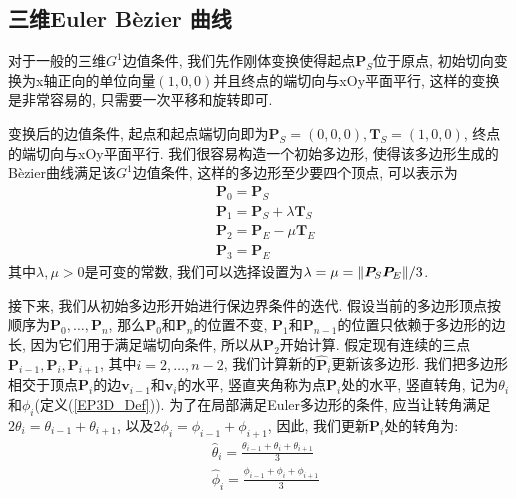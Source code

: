 \documentclass[utf8]{ctexart} %
\begin{document}
	 \subsection{三维Euler B\`{e}zier 曲线}
	 对于一般的三维$G^1$边值条件, 我们先作刚体变换使得起点$\boldsymbol{P}_S$位于原点, 初始切向变换为x轴正向的单位向量$(1,0,0)$并且终点的端切向与xOy平面平行, 这样的变换是非常容易的, 只需要一次平移和旋转即可. \par
	 变换后的边值条件, 起点和起点端切向即为$\boldsymbol{P}_S=(0,0,0), \boldsymbol{T}_S = (1,0,0)$, 终点的端切向与xOy平面平行. 我们很容易构造一个初始多边形, 使得该多边形生成的B\`ezier曲线满足该$G^1$边值条件, 这样的多边形至少要四个顶点, 可以表示为
	 \begin{equation}
	 	\begin{aligned}
	 		&\boldsymbol{P}_0 = \boldsymbol{P}_S\\
	 		&\boldsymbol{P}_1 = \boldsymbol{P}_S+\lambda\boldsymbol{T}_S\\
	 		&\boldsymbol{P}_2 = \boldsymbol{P}_E-\mu\boldsymbol{T}_E\\
	 		&\boldsymbol{P}_3 = \boldsymbol{P}_E
	 	\end{aligned}
	 \end{equation}
	 其中$\lambda, \mu>0$是可变的常数, 我们可以选择设置为$\lambda = \mu = \Arrowvert\boldsymbol{P}_S\boldsymbol{P}_E\Arrowvert/3$. \par 
	 接下来, 我们从初始多边形开始进行保边界条件的迭代. 假设当前的多边形顶点按顺序为$\boldsymbol{P}_0, \dots,\boldsymbol{P}_n$, 那么$\boldsymbol{P}_0$和$\boldsymbol{P}_n$的位置不变, $\boldsymbol{P}_1$和$\boldsymbol{P}_{n-1}$的位置只依赖于多边形的边长, 因为它们用于满足端切向条件, 所以从$\boldsymbol{P}_2$开始计算. 假定现有连续的三点$\boldsymbol{P}_{i-1},\boldsymbol{P}_i,\boldsymbol{P}_{i+1}$, 其中$i=2,\dots,n-2$, 我们计算新的$\hat{\boldsymbol{P}}_i$更新该多边形. 我们把多边形相交于顶点$\boldsymbol{P}_i$的边$\boldsymbol{v}_{i-1}$和$\boldsymbol{v}_{i}$的水平, 竖直夹角称为点$\boldsymbol{P}_i$处的水平, 竖直转角, 记为$\theta_i$和$\phi_i$(定义(\ref{EP3D_Def})). 为了在局部满足Euler多边形的条件, 应当让转角满足$2\theta_i = \theta_{i-1}+\theta_{i+1}$, 以及$2\phi_{i} = \phi_{i-1}+\phi_{i+1}$, 因此, 我们更新$\boldsymbol{P}_i$处的转角为:
	 \begin{equation}
	 	\begin{aligned}
	 		&\hat{\theta}_i = \frac{\theta_{i-1}+\theta_i+\theta_{i+1}}3\\
	 		&\hat{\phi}_i =
	 		\frac{\phi_{i-1}+\phi_i+\phi_{i+1}}3
	 	\end{aligned}
	 \end{equation}
\end{document}
